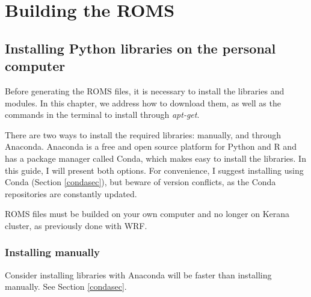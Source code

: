 \chapter{Building the ROMS}
\bigskip
\section{Installing Python libraries on the personal computer}
\bigskip

\noindent Before generating the ROMS files, it is necessary to install the libraries and modules. 
In this chapter, we address how to download them, as well as the commands in the terminal to install through \textit{apt-get}.
\bigskip

\noindent There are two ways to install the required libraries: manually, and through Anaconda. 
Anaconda is a free and open source platform for Python and R and has a package manager called Conda, which makes easy 
to install the libraries. In this guide, I will present both options. For convenience, I suggest installing using Conda 
(Section \textcolor{bleu_cite}{\ref{condasec}}), but beware of version conflicts, as the Conda repositories are constantly updated.
\bigskip

\begin{tcolorbox}[enhanced,
  grow to left by   = 0cm,
  grow to right by  = 0cm,
  enlarge top by    = 0cm,
  enlarge bottom by = 0cm,
  tcbox raise base,
  boxrule           = 1.0pt,
  left              = 18mm,
  colframe          = red!50!black,coltext=red!25!black,colback=red!10!white,
  overlay           = {\begin{tcbclipinterior}\fill[red!75!blue!50!white] (frame.south west)
    rectangle node[text=white,font=\sffamily\bfseries\footnotesize,rotate=0] {WARNING} ([xshift=18mm]frame.north west);\end{tcbclipinterior}}]
ROMS files must be builded on your own computer and no longer on Kerana cluster, as previously done with WRF.
\end{tcolorbox}
\bigskip

\subsection{Installing manually}
\bigskip
\begin{tcolorbox}[enhanced,
    grow to left by   = 0cm,
    grow to right by  = 0cm,
    enlarge top by    = 0cm,
    enlarge bottom by = 0cm,
    tcbox raise base,
    boxrule           = 1.0pt,
    left              = 18mm,
    colframe          = red!50!black,coltext=red!25!black,colback=red!10!white,
    overlay           = {\begin{tcbclipinterior}\fill[red!75!blue!50!white] (frame.south west)
      rectangle node[text=white,font=\sffamily\bfseries\footnotesize,rotate=0] {WARNING} ([xshift=18mm]frame.north west);\end{tcbclipinterior}}]
Consider installing libraries with Anaconda will be faster than installing manually. See Section \textcolor{bleu_cite}{\ref{condasec}}.
  \end{tcolorbox}
\bigskip


